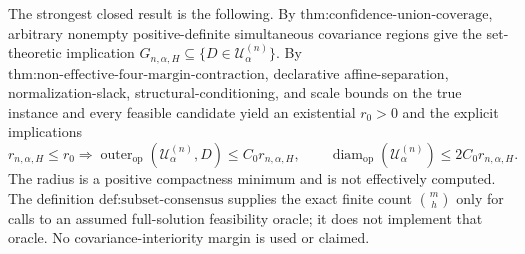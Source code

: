 The strongest closed result is the following. By \(\text{thm:confidence-union-coverage}\), arbitrary nonempty positive-definite simultaneous covariance regions give the set-theoretic implication \(G_{n,\alpha,H}\subseteq\{D\in\mathcal U^{(n)}_\alpha\}\). By \(\text{thm:non-effective-four-margin-contraction}\), declarative affine-separation, normalization-slack, structural-conditioning, and scale bounds on the true instance and every feasible candidate yield an existential \(r_0>0\) and the explicit implications
\[
r_{n,\alpha,H}\leq r_0
\Longrightarrow
\operatorname{outer}_{\mathrm{op}}(\mathcal U^{(n)}_\alpha,D)
\leq C_0r_{n,\alpha,H},
\qquad
\operatorname{diam}_{\mathrm{op}}(\mathcal U^{(n)}_\alpha)
\leq2C_0r_{n,\alpha,H}.
\]
The radius is a positive compactness minimum and is not effectively computed. The definition \(\text{def:subset-consensus}\) supplies the exact finite count \(\binom{m}{h}\) only for calls to an assumed full-solution feasibility oracle; it does not implement that oracle. No covariance-interiority margin is used or claimed.
